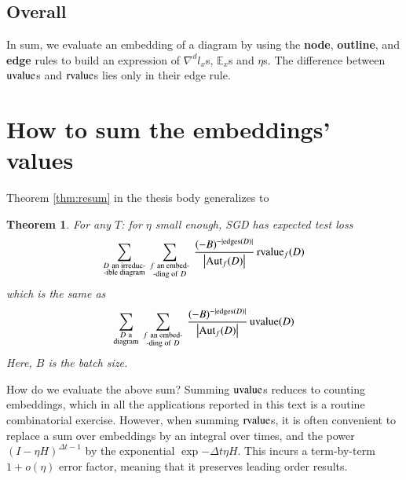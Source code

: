 \documentclass[openany, notitlepage, justified]{tufte-book}
\theoremstyle{plain}
\newtheorem*{thm*}{Theorem}
\theoremstyle{definition}
\newcommand{\wrap}[1]{\left(#1\right)}
\newcommand{\wabs}[1]{\left|#1\right|}
\newcommand{\Aut}{\text{\textnormal{Aut}}}
\newcommand{\uvalue}{\text{\textnormal{uvalue}}}
\newcommand{\rvalue}{\text{\textnormal{rvalue}}}
\newcommand{\edges}{\text{\textnormal{edges}}}
\newcommand{\expc}{\mathbb{E}}
\begin{document}
        \subsection{Overall}
            In sum, we evaluate an embedding of a diagram by using the 
            \textbf{node}, 
            \textbf{outline}, and
            \textbf{edge}
            rules to build an expression of $\nabla^d l_x$s, $\expc_x$s and
            $\eta$s.  The difference between $\uvalue$s and $\rvalue$s lies
            only in their edge rule.

    \section{How to sum the embeddings' values}                  \label{appendix:sum-embeddings}
        Theorem \ref{thm:resum} in the thesis body generalizes to
        \begin{thm*}
            For any $T$: for $\eta$ small enough, SGD has expected test loss
            \begin{equation*}
                \sum_{\substack{D~\text{an irreduc-} \\ \text{-ible diagram}}}
                ~
                \sum_{\substack{f~\text{an embed-} \\ \text{-ding of}~D}}
                ~
                \frac{(-B)^{-|\edges(D)|}}{\wabs{\Aut_f(D)}}
                \,
                {\rvalue_f}(D)
            \end{equation*}
            which is the same as
            \begin{equation*}
                \sum_{\substack{D~\text{a} \\ \text{diagram}}}
                ~
                \sum_{\substack{f~\text{an embed-} \\ \text{-ding of}~D}}
                ~
                \frac{(-B)^{-|\edges(D)|}}{\wabs{\Aut_f(D)}}
                \,
                {\uvalue}(D)
            \end{equation*}
            Here, $B$ is the batch size.
        \end{thm*}

        How do we evaluate the above sum?
        Summing $\uvalue$s reduces to counting embeddings, which in all the
        applications reported in this text is a routine combinatorial exercise. 
        However, when summing $\rvalue$s, it is often convenient to replace
        a sum over embeddings by an integral over times, and
        the power $\wrap{I-\eta H}^{\Delta t-1}$ by
        the exponential $\exp{-\Delta t \eta H}$.  This incurs a term-by-term
        $1+o(\eta)$ error factor, meaning that it preserves leading order
        results. 
\end{document}
